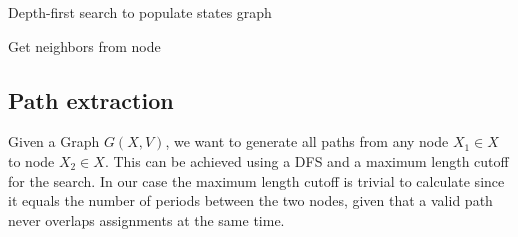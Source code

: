 \documentclass[a4paper,11pt]{article}
\begin{document}
    \begin{algorithm}
    \DontPrintSemicolon
    \BlankLine
    \caption{Depth-first search to populate states graph}\label{algo:graph-building}
    \end{algorithm}

    \begin{algorithm}
    \DontPrintSemicolon
    \BlankLine
    \caption{Get neighbors from node}\label{algo:node-neighbors}
    \end{algorithm}

  \subsection{Path extraction}

    Given a Graph $G(X,V)$, we want to generate all paths from any node $X_1 \in X$ to node $X_2 \in X$. This can be achieved using a DFS and a maximum length cutoff for the search. In our case the maximum length cutoff is trivial to calculate since it equals the number of periods between the two nodes, given that a valid path never overlaps assignments at the same time.
\end{document}
